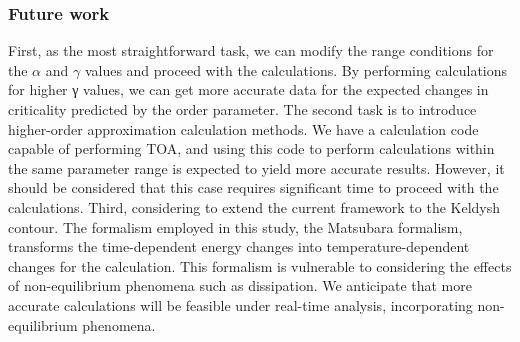 \documentclass{article}[12pt]
\numberwithin{equation}{section}
\begin{document}
\begin{spacing}{1.5}
\subsubsection*{Future work}
First, as the most straightforward task, we can modify the range conditions for the $\alpha$ and $\gamma$ values and proceed with the calculations. By performing calculations for higher γ values, we can get more accurate data for the expected changes in criticality predicted by the order parameter.
The second task is to introduce higher-order approximation calculation methods. We have a calculation code capable of performing TOA, and using this code to perform calculations within the same parameter range is expected to yield more accurate results. However, it should be considered that this case requires significant time to proceed with the calculations.
Third, considering to extend the current framework to the Keldysh contour. The formalism employed in this study, the Matsubara formalism, transforms the time-dependent energy changes into temperature-dependent changes for the calculation. This formalism is vulnerable to considering the effects of non-equilibrium phenomena such as dissipation. We anticipate that more accurate calculations will be feasible under real-time analysis, incorporating non-equilibrium phenomena.
\end{spacing}
\pagebreak
\newpage
\appendix
\end{document}
